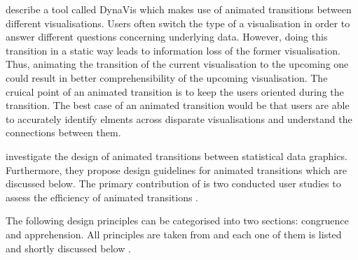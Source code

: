 \citeauthor{Heer2007} describe a tool called DynaVis which makes use of animated transitions between different visualisations. Users often switch the type of a visualisation in order to answer different questions concerning underlying data. However, doing this transition in a static way leads to information loss of the former visualisation. Thus, animating the transition of the current visualisation to the upcoming one could result in better comprehensibility of the upcoming visualisation. The cruical point of an animated transition is to keep the users oriented during the transition. The best case of an animated transition would be that users are able to accurately identify elments across disparate visualisations and understand the connections between them.

\citeauthor{Heer2007} investigate the design of animated transitions between statistical data graphics. Furthermore, they propose design guidelines for animated transitions which are discussed below. The primary contribution of \citeauthor{Heer2007} is two conducted user studies to assess the efficiency of animated transitions .

The following design principles can be categorised into two sections: congruence and apprehension. All principles are taken from \citeauthor{Heer2007} and each one of them is listed and shortly discussed below .

